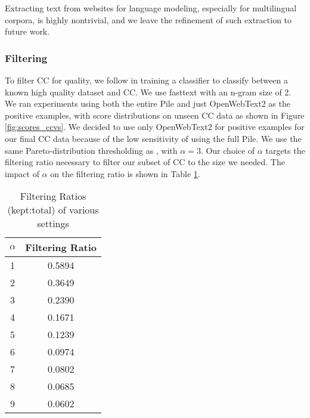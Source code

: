 \documentclass[11pt,a4paper]{article}
\begin{document}
\begin{appendices}
Extracting text from websites for language modeling, especially for multilingual corpora, is highly nontrivial, and we leave the refinement of such extraction to future work. %

\subsubsection{Filtering}

To filter CC for quality, we follow \citet{GPT3} in training a classifier to classify between a known high quality dataset and CC. We use fasttext with an n-gram size of 2. We ran experiments using both the entire Pile and just OpenWebText2 as the positive examples, with score distributions on unseen CC data as shown in Figure \ref{fig:scores_ccvs}. We decided to use only OpenWebText2 for positive examples for our final CC data because of the low sensitivity of using the full Pile. We use the same Pareto-distribution thresholding as \citet{GPT3}, with $\alpha = 3$. Our choice of $\alpha$ targets the filtering ratio necessary to filter our subset of CC to the size we needed. The impact of $\alpha$ on the filtering ratio is shown in Table \ref{table:cc_alpha_ratio}.

\begin{table}
\centering
\begin{tabular}{c c} %
\toprule %
$\alpha$ & Filtering Ratio \\ [0.5ex] %
\midrule %
1 & 0.5894 \\
2 & 0.3649 \\
3 & 0.2390 \\
4 & 0.1671 \\
5 & 0.1239 \\
6 & 0.0974 \\
7 & 0.0802 \\
8 & 0.0685 \\
9 & 0.0602 \\
\bottomrule %
\end{tabular}
\caption{Filtering Ratios (kept:total) of various settings} %
\label{table:cc_alpha_ratio} %
\end{table}

 \begin{figure*}%
    \centering
    \qquad
    \caption{Score distribution of documents from Common Crawl given different classifier training data.}%
    \label{fig:scores_ccvs}%
\end{figure*}


\end{appendices}
\end{document}
